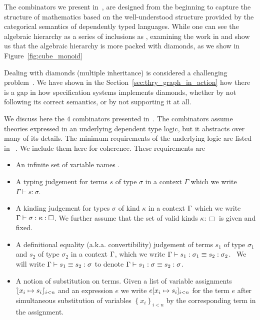 The combinators we present in~\cite{carette2018building}, are designed from the beginning to capture the structure of mathematics based on the well-understood structure provided by the categorical semantics of dependently typed languages. While one can see the algebraic hierarchy as a series of inclusions as , examining the work in \cite{halleck} and \cite{jipsen} show us that the algebraic hierarchy is more packed with diamonds, as we show in Figure~\ref{fig:cube_monoid} 

Dealing with diamonds (multiple inheritance) is considered a challenging problem~\cite{sakkinen1989disciplined, jigsaw1992, traits2006, diamonds2011}. We have shown in the Section~\ref{sec:thry_graph_in_action} how there is a gap in how specification systems implements diamonds, whether by not following its correct semantics, or by not supporting it at all. 

We discuss here the $4$ combinators presented in~\cite{CaretteOConnorTPC, carette2018building}. The combinators assume theories expressed in an underlying dependent type logic, but it abstracts over many of its details. The minimum requirements of the underlying logic are listed in ~\cite{carette2018building}. We include them here for coherence. These requirements are 
\begin{itemize}
    \item An infinite set of variable names \vars.
    
    \item A typing judgement for terms $s$ of type $\sigma$ in a context
    $\Gamma$ which we write $\Gamma \vdash s : \sigma$.
    
    \item A kinding judgement for types $\sigma$ of kind $\kappa$ in a context
    $\Gamma$ which we write\\
    $\Gamma \vdash \sigma : \kappa : \Box$.  We further assume that the set
    of valid kinds $\kappa : \Box$ is given and fixed.
    
    \item A definitional equality (a.k.a. convertibility) judgement of terms
    $s_1$ of type $\sigma_1$ and $s_2$ of type $\sigma_2$ in a context $\Gamma$,
    which we write $\Gamma \vdash s_1 : \sigma_1 \equiv s_2 : \sigma_2$. \ We
    will write $\Gamma \vdash s_1 \equiv s_2 : \sigma$ to denote $\Gamma \vdash
    s_1 : \sigma \equiv s_2 : \sigma$.
    
    \item A notion of substitution on terms. Given a list of variable
    assignments $\lbag x_i \mapsto s_i \rbag_{i < n}$
    and an expression $e$ we write $e[ x_i \mapsto s_i ]_{i < n}$
    for the term $e$ after simultaneous substitution of variables $\left\{ x_i
    \right\}_{i < n}$ by the corresponding term in the assignment.
\end{itemize}

